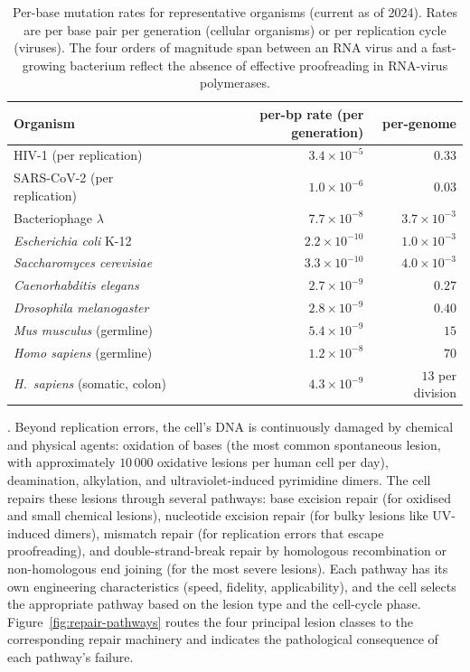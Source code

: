 \begin{table}[h]
\centering
\caption{Per-base mutation rates for representative organisms (current
as of 2024). Rates are per base pair per generation (cellular
organisms) or per replication cycle (viruses). The four orders of
magnitude span between an RNA virus and a fast-growing bacterium
reflect the absence of effective proofreading in RNA-virus
polymerases.}
\label{tab:mutation-rates}
\small
\begin{tabular}{lrr}
\toprule
Organism & per-bp rate (per generation) & per-genome \\
\midrule
HIV-1 (per replication)       & $3.4 \times 10^{-5}$  & $0.33$ \\
SARS-CoV-2 (per replication)  & $1.0 \times 10^{-6}$  & $0.03$ \\
Bacteriophage $\lambda$       & $7.7 \times 10^{-8}$  & $3.7 \times 10^{-3}$ \\
\emph{Escherichia coli} K-12  & $2.2 \times 10^{-10}$ & $1.0 \times 10^{-3}$ \\
\emph{Saccharomyces cerevisiae} & $3.3 \times 10^{-10}$ & $4.0 \times 10^{-3}$ \\
\emph{Caenorhabditis elegans} & $2.7 \times 10^{-9}$  & $0.27$ \\
\emph{Drosophila melanogaster} & $2.8 \times 10^{-9}$ & $0.40$ \\
\emph{Mus musculus} (germline) & $5.4 \times 10^{-9}$ & $15$ \\
\emph{Homo sapiens} (germline) & $1.2 \times 10^{-8}$ & $70$ \\
\emph{H.~sapiens} (somatic, colon) & $4.3 \times 10^{-9}$ & $13$ per division \\
\bottomrule
\end{tabular}
\end{table}

. Beyond replication errors, the cell's
DNA is continuously damaged by chemical and physical agents: oxidation
of bases (the most common spontaneous lesion, with approximately
$10\,000$ oxidative lesions per human cell per day), deamination,
alkylation, and ultraviolet-induced pyrimidine dimers. The cell repairs
these lesions through several pathways: base excision repair (for
oxidised and small chemical lesions), nucleotide excision repair (for
bulky lesions like UV-induced dimers), mismatch repair (for replication
errors that escape proofreading), and double-strand-break repair by
homologous recombination or non-homologous end joining (for the
most severe lesions). Each pathway has its own engineering
characteristics (speed, fidelity, applicability), and the cell selects
the appropriate pathway based on the lesion type and the cell-cycle
phase. Figure~\ref{fig:repair-pathways} routes the four principal
lesion classes to the corresponding repair machinery and indicates the
pathological consequence of each pathway's failure.

